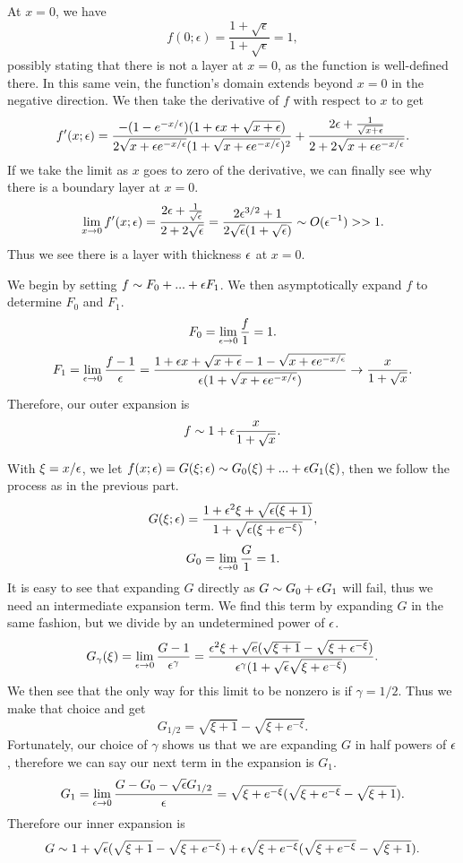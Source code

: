\benum
\item At $x=0$, we have
$$f(0;\epsilon)=\frac{1+\sqrt{\epsilon}}{1+\sqrt{\epsilon}}=1,$$
possibly stating that there is not a layer at $x=0$, as the function is well-defined there. In this same vein, the function's domain extends beyond $x=0$ in the negative direction. We then take the derivative of $f$ with respect to $x$ to get
$$f'(x;\epsilon)=\frac{-(1-e^{-x/\epsilon})(1+\epsilon x+\sqrt{x +\epsilon})}{2\sqrt{x+\epsilon e^{-x/\epsilon}}(1+\sqrt{x+\epsilon e^{-x/\epsilon}})^2}+\frac{2\epsilon+\frac{1}{\sqrt{x+\epsilon}}}{2+2\sqrt{x+\epsilon e^{-x/\epsilon}}}.$$
If we take the limit as $x$ goes to zero of the derivative, we can finally see why there is a boundary layer at $x=0.$
$$\lim_{x\to 0}f'(x;\epsilon)=\frac{2\epsilon+\frac{1}{\sqrt{\epsilon}}}{2+2\sqrt{\epsilon}}=\frac{2\epsilon^{3/2}+1}{2\sqrt{\epsilon}(1+\sqrt{\epsilon})}\sim O(\epsilon^{-1})>>1.$$
Thus we see there is a layer with thickness $\epsilon$ at $x=0.$

\item We begin by setting $f\sim F_0+...+\epsilon F_1$. We then asymptotically expand $f$ to determine $F_0$ and $F_1$.
    $$F_0=\lim_{\epsilon\to 0}\frac{f}{1}=1.$$
    $$F_1=\lim_{\epsilon\to 0}\frac{f-1}{\epsilon}=\frac{1+\epsilon x+\sqrt{x+\epsilon}-1-\sqrt{x+\epsilon e^{-x/\epsilon}}}{\epsilon(1+\sqrt{x+\epsilon e^{-x/\epsilon}})}\to \frac{x}{1+\sqrt{x}}.$$
    Therefore, our outer expansion is
    $$f\sim1+\epsilon\frac{x}{1+\sqrt{x}}.$$

\item With $\xi=x/\epsilon$, we let $f(x;\epsilon)=G(\xi;\epsilon)\sim G_0(\xi)+...+\epsilon G_1(\xi)$, then we follow the process as in the previous part.
    $$G(\xi;\epsilon)=\frac{1+\epsilon^2\xi+\sqrt{\epsilon(\xi+1)}}{1+\sqrt{\epsilon(\xi+e^{-\xi})}},$$
    $$G_0=\lim_{\epsilon\to 0}\frac{G}{1}=1.$$
    It is easy to see that expanding $G$ directly as $G\sim G_0+\epsilon G_1$ will fail, thus we need an intermediate expansion term. We find this term by expanding $G$ in the same fashion, but we divide by an undetermined power of $\epsilon$.
    $$G_\gamma(\xi)=\lim_{\epsilon\to 0}\frac{G-1}{\epsilon^\gamma}=\frac{\epsilon^2\xi+\sqrt{e}(\sqrt{\xi+1}-\sqrt{\xi+\epsilon^{-\xi}})}{\epsilon^\gamma(1+\sqrt{\epsilon}\sqrt{\xi+e^{-\xi}})}.$$
    We then see that the only way for this limit to be nonzero is if $\gamma=1/2$. Thus we make that choice and get
    $$G_{1/2}=\sqrt{\xi+1}-\sqrt{\xi+e^{-\xi}}.$$
    Fortunately, our choice of $\gamma$ shows us that we are expanding $G$ in half powers of $\epsilon$, therefore we can say our next term in the expansion is $G_1.$
    $$G_1=\lim_{\epsilon\to 0}\frac{G-G_0-\sqrt{\epsilon}G_{1/2}}{\epsilon}=\sqrt{\xi+e^{-\xi}}(\sqrt{\xi+e^{-\xi}}-\sqrt{\xi+1}).$$
    Therefore our inner expansion is
    $$G\sim 1+\sqrt{\epsilon}(\sqrt{\xi+1}-\sqrt{\xi+e^{-\xi}})+\epsilon\sqrt{\xi+e^{-\xi}}(\sqrt{\xi+e^{-\xi}}-\sqrt{\xi+1}).$$

